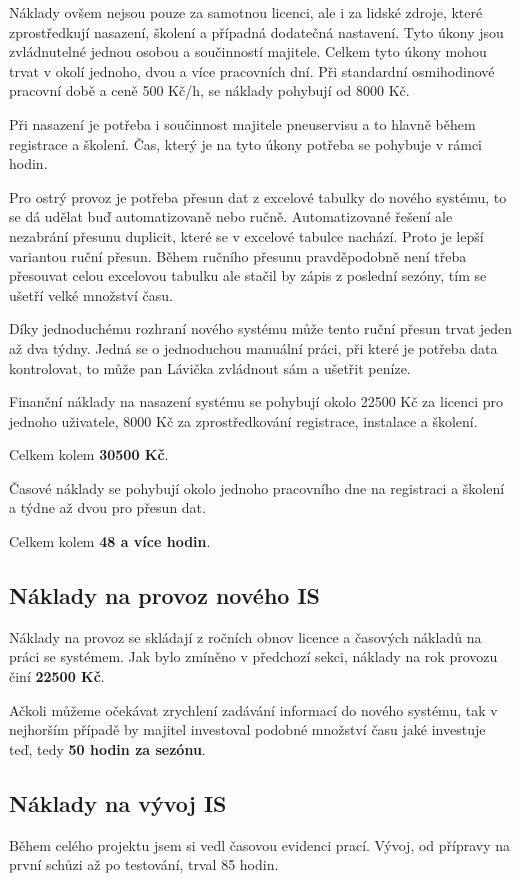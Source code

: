 Náklady ovšem nejsou pouze za samotnou licenci, ale i za lidské zdroje, které zprostředkují nasazení, školení a případná dodatečná nastavení. Tyto úkony jsou zvládnutelné jednou osobou a součinností majitele. Celkem tyto úkony mohou trvat v okolí jednoho, dvou a více pracovních dní. Při standardní osmihodinové pracovní době a ceně 500 Kč/h, se náklady pohybují od 8000 Kč.

Při nasazení je potřeba i součinnost majitele pneuservisu a to hlavně během registrace a školení. Čas, který je na tyto úkony potřeba se pohybuje v rámci hodin.

Pro ostrý provoz je potřeba přesun dat z excelové tabulky do nového systému, to se dá udělat buď automatizovaně nebo ručně. Automatizované řešení ale nezabrání přesunu duplicit, které se v excelové tabulce nachází. Proto je lepší variantou ruční přesun. Během ručního přesunu pravděpodobně není třeba přesouvat celou excelovou tabulku ale stačil by zápis z poslední sezóny, tím se ušetří velké množství času.

Díky jednoduchému rozhraní nového systému může tento ruční přesun trvat jeden až dva týdny. Jedná se o jednoduchou manuální práci, při které je potřeba data kontrolovat, to může pan Lávička zvládnout sám a ušetřit peníze.

Finanční náklady na nasazení systému se pohybují okolo 22500 Kč za licenci pro jednoho uživatele, 8000 Kč za zprostředkování registrace, instalace a školení. 

Celkem kolem \textbf{30500 Kč}.

Časové náklady se pohybují okolo jednoho pracovního dne na registraci a školení a týdne až dvou pro přesun dat. 

Celkem kolem \textbf{48 a více hodin}.
\subsection{Náklady na provoz nového IS}
Náklady na provoz se skládají z ročních obnov licence a časových nákladů na práci se systémem. Jak bylo zmíněno v předchozí sekci, náklady na rok provozu činí \textbf{22500 Kč}.

Ačkoli můžeme očekávat zrychlení zadávání informací do nového systému, tak v nejhorším případě by majitel investoval podobné množství času jaké investuje teď, tedy \textbf{50 hodin za sezónu}.
\subsection{Náklady na vývoj IS}
Během celého projektu jsem si vedl časovou evidenci prací. Vývoj, od přípravy na první schůzi až po testování, trval 85 hodin. 

